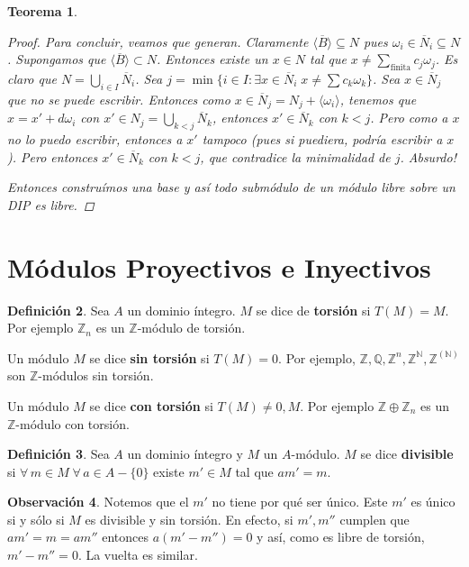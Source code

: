 \documentclass[12pt]{book}
\newtheorem{teo}{Teorema}[section]
\theoremstyle{definition}
\newtheorem{obs}[teo]{Observación}
\newtheorem{defn}[teo]{Definición}
\newcommand{\ZZ}{\mathbb{Z}}      %
\newcommand{\NN}{\mathbb{N}}
\newcommand{\QQ}{\mathbb{Q}}
\begin{document}
\begin{teo}
\begin{proof}
Para concluir, veamos que generan. Claramente $\langle\overline{B}\rangle\subseteq N$ pues $\omega_i \in \overline{N}_i\subseteq N$. Supongamos que $\langle\overline{B}\rangle \subset N$. Entonces existe un $x\in N$ tal que $x\neq \displaystyle\sum_{\text{finita}} c_j\omega_j$. Es claro que $N=\displaystyle\bigcup_{i\in I}\overline{N}_i$. Sea $j = \min\{i\in I : \exists x\in \overline{N}_i \; x\neq \displaystyle\sum c_k\omega_k\}$. Sea $x\in\overline{N}_j$ que no se puede escribir. Entonces como $x\in\overline{N}_j = N_j + \langle \omega_i\rangle$, tenemos que $x=x'+d\omega_i$ con $x'\in N_j=\displaystyle\bigcup_{k<j}\overline{N}_k$, entonces $x'\in\overline{N}_k$ con $k<j$. Pero como a $x$ no lo puedo escribir, entonces a $x'$ tampoco (pues si puediera, podría escribir a $x$). Pero entonces $x'\in\overline{N}_k$ con $k<j$, que contradice la minimalidad de $j$. Absurdo!

Entonces construímos una base y así todo submódulo de un módulo libre sobre un DIP es libre.

\end{proof}
\end{teo}

\section{Módulos Proyectivos e Inyectivos}

\begin{defn}
Sea $A$ un dominio íntegro. $M$ se dice de \textbf{torsión} si $T(M)=M$. Por ejemplo $\ZZ_n$ es un $\ZZ$-módulo de torsión.

Un módulo $M$ se dice \textbf{sin torsión} si $T(M)=0$. Por ejemplo, $\ZZ,\QQ,\ZZ^n,\ZZ^\NN,\ZZ^{(\NN)}$ son $\ZZ$-módulos sin torsión.

Un módulo $M$ se dice \textbf{con torsión} si $T(M)\neq 0,M$. Por ejemplo $\ZZ\oplus\ZZ_n$ es un $\ZZ$-módulo con torsión.
\end{defn}

\begin{defn}
Sea $A$ un dominio íntegro y $M$ un $A$-módulo. $M$ se dice \textbf{divisible} si $\forall\, m\in M\; \forall\, a\in A-\{0\}$ existe $m'\in M$ tal que $am'=m$.
\end{defn}

\begin{obs}
Notemos que el $m'$ no tiene por qué ser único. Este $m'$ es único si y sólo si $M$ es divisible y sin torsión. En efecto, si $m',m''$ cumplen que $am' = m = am''$ entonces $a(m'-m'') = 0$ y así, como es libre de torsión, $m'-m''=0$. La vuelta es similar.
\end{obs}
\end{document}
